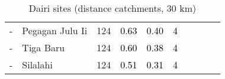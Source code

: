 \begin{table}[ht]
\begin{tabular}{C{0.05\textwidth}C{0.15\textwidth}C{0.08\textwidth}C{0.08\textwidth}C{0.08\textwidth}C{0.08\textwidth}C{0.08\textwidth}C{0.08\textwidth}C{0.08\textwidth}C{0.08\textwidth}}
  {-} & Pegagan Julu Ii & 124 & \textcolor[HTML]{000000}{0.63} & \textcolor[HTML]{000000}{0.40} & \textcolor[HTML]{000000}{4} &  &  &  &  \\ 
  {-} & Tiga Baru & 124 & \textcolor[HTML]{000000}{0.60} & \textcolor[HTML]{000000}{0.38} & \textcolor[HTML]{000000}{4} &  &  &  &  \\ 
  {-} & Silalahi & 124 & \textcolor[HTML]{000000}{0.51} & \textcolor[HTML]{000000}{0.31} & \textcolor[HTML]{000000}{4} &  &  &  &  \\ 
  \end{tabular}
\endgroup
\caption{Dairi sites (distance catchments, 30 km)} 
\label{tab:dairi_dist}
\end{table}
